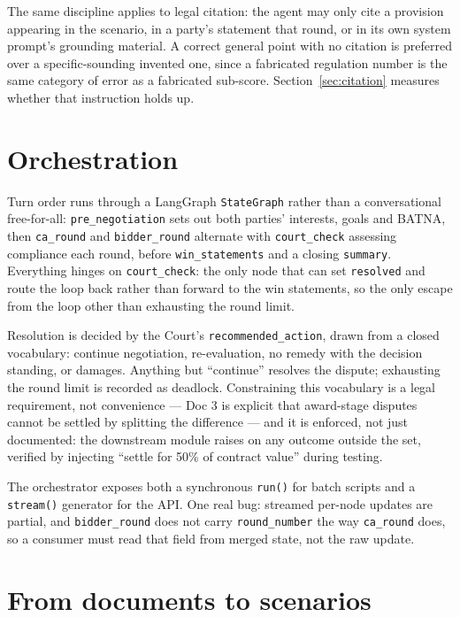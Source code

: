 The same discipline applies to legal citation: the agent may only cite a
provision appearing in the scenario, in a party's statement that round, or
in its own system prompt's grounding material. A correct general point with
no citation is preferred over a specific-sounding invented one, since a
fabricated regulation number is the same category of error as a fabricated
sub-score. Section~\ref{sec:citation} measures whether that instruction
holds up.

\section{Orchestration}
\label{sec:orchestration}

Turn order runs through a LangGraph \texttt{StateGraph} rather than a
conversational free-for-all: \texttt{pre\_negotiation} sets out both
parties' interests, goals and BATNA, then \texttt{ca\_round} and
\texttt{bidder\_round} alternate with \texttt{court\_check} assessing
compliance each round, before \texttt{win\_statements} and a closing
\texttt{summary}. Everything hinges on \texttt{court\_check}: the only node
that can set \texttt{resolved} and route the loop back rather than forward
to the win statements, so the only escape from the loop other than
exhausting the round limit.

Resolution is decided by the Court's \texttt{recommended\_action}, drawn from
a closed vocabulary: continue negotiation, re-evaluation, no remedy with the
decision standing, or damages. Anything but ``continue'' resolves the
dispute; exhausting the round limit is recorded as deadlock. Constraining
this vocabulary is a legal requirement, not convenience --- Doc 3 is
explicit that award-stage disputes cannot be settled by splitting the
difference --- and it is enforced, not just documented: the downstream
module raises on any outcome outside the set, verified by injecting
``settle for 50\% of contract value'' during testing.

The orchestrator exposes both a synchronous \texttt{run()} for batch scripts
and a \texttt{stream()} generator for the API. One real bug: streamed
per-node updates are partial, and \texttt{bidder\_round} does not carry
\texttt{round\_number} the way \texttt{ca\_round} does, so a consumer must
read that field from merged state, not the raw update.

\section{From documents to scenarios}
\label{sec:extraction}

